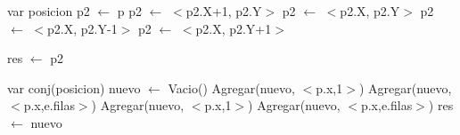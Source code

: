 \begin{algorithm}[H]
\begin{algorithmic}[1]
 
		  \State var posicion p2 $\gets$ p	      
	        \State p2 $\gets$ $<$p2.X+1, p2.Y$>$   
	  \Else
            \State p2 $\gets$ $<$p2.X, p2.Y$>$   
          \Else
              
          		\State p2 $\gets$ $<$p2.X, p2.Y-1$>$ 
          	  \Else 
          		\State p2 $\gets$ $<$p2.X, p2.Y+1$>$ 
   			 \EndIf		   
		  \EndIf		
      \EndIf
      
    \State res $\gets$ p2     
\EndFunction
\end{algorithmic}
\end{algorithm}

\begin{algorithm}[H]
\begin{algorithmic}[1]
 
		  \State var conj(posicion) nuevo $\gets$ Vacio()	      
	       
		        \State Agregar(nuevo, $<$p.x,1$>$) 
	      \Else
		      	 
        		    \State Agregar(nuevo, $<$p.x,e.filas$>$) 
		        \Else
        	  		\State Agregar(nuevo, $<$p.x,1$>$) 
					\State Agregar(nuevo, $<$p.x,e.filas$>$) 
				\EndIf
     	 \EndIf
    \State res $\gets$ nuevo     
\EndFunction
\end{algorithmic}
\end{algorithm}






















